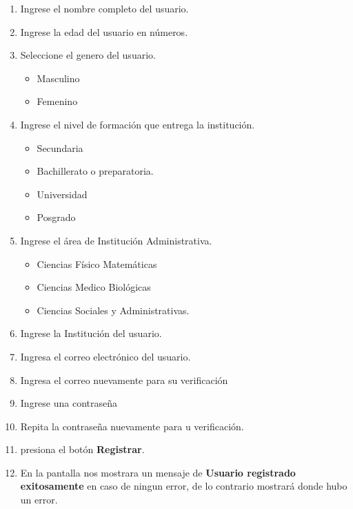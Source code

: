 \begin{enumerate}

	\item Ingrese el nombre completo del usuario.
	\item Ingrese la edad del usuario en números. 
	\item Seleccione el genero del usuario. 
	\begin{itemize}
		\item Masculino
		\item Femenino
	\end{itemize}
	\item Ingrese el nivel de formación que entrega la institución.
		\begin{itemize}
			\item Secundaria
			\item Bachillerato o preparatoria.
			\item Universidad
			\item Posgrado
		\end{itemize}
	\item Ingrese el área de Institución Administrativa.
		\begin{itemize}
			\item Ciencias Físico Matemáticas 
			\item Ciencias Medico Biológicas 
			\item Ciencias Sociales y Administrativas.
		\end{itemize}
	\item Ingrese la Institución del usuario. 
	
	
	\item Ingresa el correo electrónico del usuario.
	\item Ingresa el correo nuevamente para su verificación
	
	\item Ingrese una contraseña 
	\item Repita la contraseña nuevamente para u verificación.
	
	\item presiona el botón \textbf{Registrar}.
	\item En la pantalla nos mostrara un mensaje de \textbf{Usuario registrado exitosamente} en caso de ningun error, de lo contrario mostrará donde hubo un error.
\end{enumerate}

	